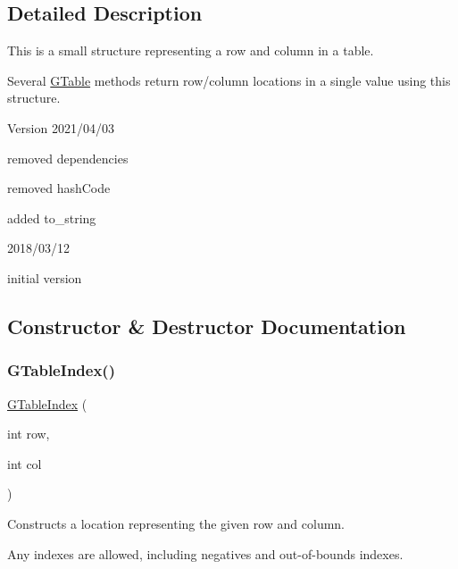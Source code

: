 \subsection{Detailed Description}
This is a small structure representing a row and column in a table. 

Several \mbox{\hyperlink{classsgl_1_1GTable}{G\+Table}} methods return row/column locations in a single value using this structure.

\begin{DoxyVersion}{Version}
2021/04/03
\begin{DoxyItemize}
\item removed dependencies
\item removed hash\+Code
\item added to\+\_\+string 
\end{DoxyItemize}

2018/03/12
\begin{DoxyItemize}
\item initial version 
\end{DoxyItemize}
\end{DoxyVersion}


\subsection{Constructor \& Destructor Documentation}
\mbox{\label{structsgl_1_1GTableIndex_acce37e5fd80f249f95890ad8aa4aa4e4}} 
\subsubsection{\texorpdfstring{G\+Table\+Index()}{GTableIndex()}\hspace{0.1cm}{\footnotesize\ttfamily [1/2]}}
{\footnotesize\ttfamily \mbox{\hyperlink{structsgl_1_1GTableIndex}{G\+Table\+Index}} (\begin{DoxyParamCaption}\item[{int}]{row,  }\item[{int}]{col }\end{DoxyParamCaption})}



Constructs a location representing the given row and column. 

Any indexes are allowed, including negatives and out-\/of-\/bounds indexes. \mbox{\label{structsgl_1_1GTableIndex_a711af6c0d4a8d8a2616b24adecf0c7e1}} 
